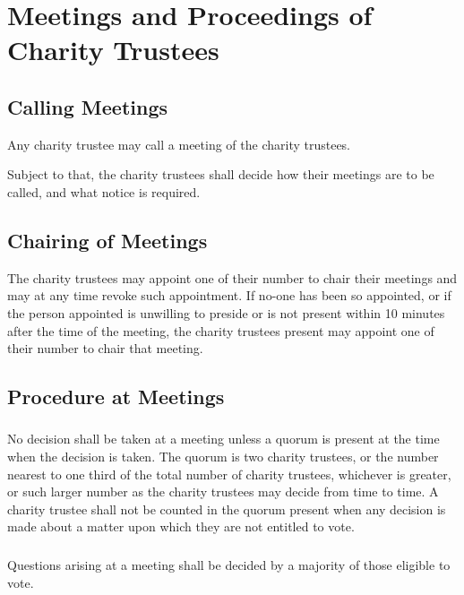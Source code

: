 \section{Meetings and Proceedings of Charity Trustees}\label{sec:meetings}

    \subsection{Calling Meetings}
    Any charity trustee may call a meeting of the charity trustees.

    Subject to that, the charity trustees shall decide how their meetings are to be called, and what notice is required.

    \subsection{Chairing of Meetings}\label{sec:chairing_of_meetings}
    The charity trustees may appoint one of their number to chair their meetings and may at any time revoke such appointment. If no-one has been so appointed, or if the person appointed is unwilling to preside or is not present within 10 minutes after the time of the meeting, the charity trustees present may appoint one of their number to chair that meeting.

    \subsection{Procedure at Meetings}

        \subsubsection{}
        No decision shall be taken at a meeting unless a quorum is present at the time when the decision is taken. The quorum is two charity trustees, or the number nearest to one third of the total number of charity trustees, whichever is greater, or such larger number as the charity trustees may decide from time to time. A charity trustee shall not be counted in the quorum present when any decision is made about a matter upon which they are not entitled to vote.

        \subsubsection{}
        Questions arising at a meeting shall be decided by a majority of those eligible to vote.

